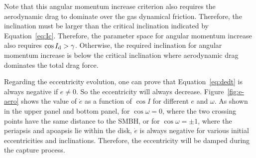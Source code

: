 \documentclass[fleqn,usenatbib]{mnras}
\begin{document}
 Note that this angular momentum increase criterion also requires the aerodynamic drag to dominate over the gas dynamical friction. Therefore, the inclination must be larger than the critical inclination indicated by Equation~\ref{eq:Ic}. Therefore, the parameter space for angular momentum increase also requires $\cos I_{\rm d} > \gamma$. Otherwise, the required inclination for angular momentum increase is below the critical inclination where aerodynamic drag dominates the total drag force.

Regarding the eccentricity evolution, one can prove that Equation~\ref{eq:dedt} is always negative if $e\neq0$. So the eccentricity will always decrease. Figure~\ref{fig:e-aero} shows the value of $\dot{e}$ as a function of $\cos I$ for different $e$ and $\omega$. As shown in the upper panel and bottom panel, for $\cos\omega=0$, where the two crossing points have the same distance to the SMBH, or for $\cos\omega=\pm1$, where the periapsis and apoapsis lie within the disk, $\dot{e}$ is always negative for various initial eccentricities and inclinations. Therefore, the eccentricity will be damped during the capture process. 





\end{document}
